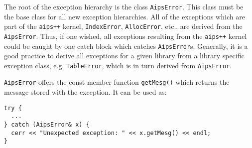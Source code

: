 The root of the exception hierarchy is the class {\tt AipsError}. This class
must be the base class for all new exception hierarchies. All of the exceptions
which are part of the {\tt aips++} kernel, {\tt IndexError}, {\tt AllocError},
etc., are derived from the {\tt AipsError}. Thus, if one wished, all 
exceptions resulting from the {\tt aips++} kernel could be caught by one catch
block which catches {\tt AipsError}s. Generally, it is a
good practice to derive all exceptions for a given library from a library
specific exception class, e.g. {\tt TableError}, which is in turn derived 
from {\tt AipsError}.

{\tt AipsError} offers the const member function {\tt getMesg()}
which returns the message stored with the exception. It can be used as:
\begin{verbatim}
try {
  ...
} catch (AipsError& x) {
  cerr << "Unexpected exception: " << x.getMesg() << endl;
}
\end{verbatim}
